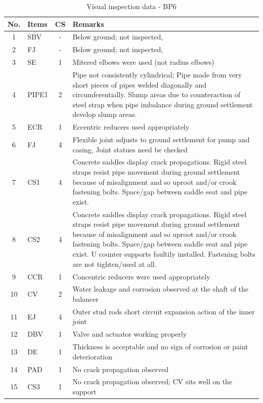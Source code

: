 \begin{table}[!h]
	\caption{Visual inspection data - BP6}
	\label{ch04_visualinspectionbp6}
		{\scriptsize
\begin{tabular}{c|l|c|p{12cm}}
\hline
No. & Items & CS & Remarks \\ 
\hline
1 & SBV & - & Below ground; not inspected,  \\ 
2 & FJ & - & Below ground; not inspected, \\ 
3 & SE & 1 & Mitered elbows were used (not radius elbows) \\ 
4 & PIPE1 & 2 & Pipe not consistently cylindrical; Pipe made from very short pieces of pipes welded diagonally and circumferentially. Slump areas due to counteraction of steel strap when pipe imbalance during ground settlement develop slump areas. \\ 
5 & ECR & 1 & Eccentric reducers used appropriately \\ 
6 & FJ & 4 & Flexible joint adjusts to ground settlement for pump and casing, Joint statues need be checked \\ 
7 & CS1 & 4 & Concrete saddles display crack propagations. Rigid steel straps resist pipe movement during ground settlement because of misalignment and so uproot and/or crook fastening bolts. Space/gap between saddle seat and pipe exist. \\ 
8 & CS2 & 4 & Concrete saddles display crack propagations. Rigid steel straps resist pipe movement during ground settlement because of misalignment and so uproot and/or crook fastening bolts. Space/gap between saddle seat and pipe exist. U counter supports faultily installed. Fastening bolts are not tighten/used at all. \\ 
9 & CCR & 1 & Concentric reducers were used appropriately \\ 
10 & CV & 2 & Water leakage and corrosion observed at the shaft of the balancer \\ 
11 & EJ & 4 & Outer stud rods short circuit expansion action of the inner joint \\ 
12 & DBV & 1 & Valve and actuator working properly  \\ 
13 & DE & 1 & Thickness is acceptable and no sign of corrosion or paint deterioration \\ 
14 & PAD & 1 & No crack propagation observed \\ 
15 & CS3 & 1 & No crack propagation observed; CV sits well on the support  \\ 
\hline
\end{tabular}			
		}
\end{table}


